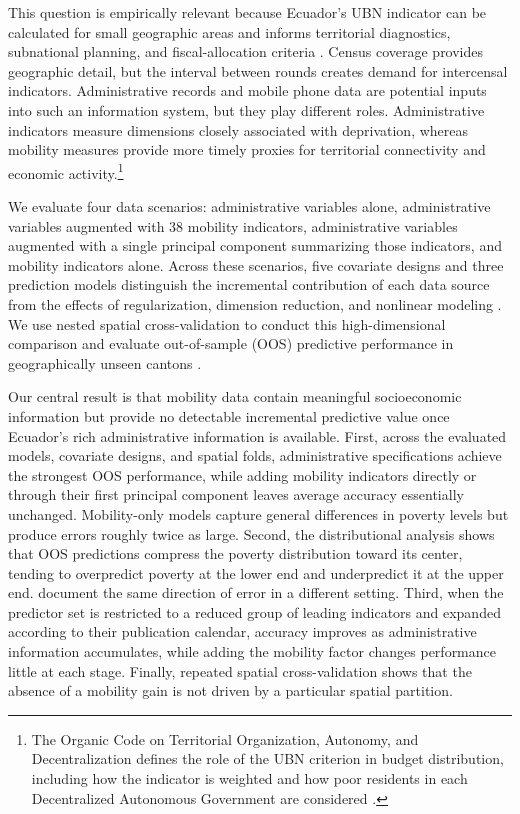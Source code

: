 \documentclass[pdflatex,sn-apa]{sn-jnl}
\begin{document}
This question is empirically relevant because Ecuador's UBN indicator can be calculated for small geographic areas and informs territorial diagnostics, subnational planning, and fiscal-allocation criteria \citep{INEC2024NBI, COOTAD2010}. Census coverage provides geographic detail, but the interval between rounds creates demand for intercensal indicators. Administrative records and mobile phone data are potential inputs into such an information system, but they play different roles. Administrative indicators measure dimensions closely associated with deprivation, whereas mobility measures provide more timely proxies for territorial connectivity and economic activity.\footnote{The Organic Code on Territorial Organization, Autonomy, and Decentralization defines the role of the UBN criterion in budget distribution, including how the indicator is weighted and how poor residents in each Decentralized Autonomous Government are considered \citep{COOTAD2010}.}

We evaluate four data scenarios: administrative variables alone, administrative variables augmented with 38 mobility indicators, administrative variables augmented with a single principal component summarizing those indicators, and mobility indicators alone. Across these scenarios, five covariate designs and three prediction models distinguish the incremental contribution of each data source from the effects of regularization, dimension reduction, and nonlinear modeling \citep{Tibshirani1996, Hastie2009, chen2016xgboost}. We use nested spatial cross-validation to conduct this high-dimensional comparison and evaluate out-of-sample (OOS) predictive performance in geographically unseen cantons \citep{Mahoney2023}.

Our central result is that mobility data contain meaningful socioeconomic information but provide no detectable incremental predictive value once Ecuador's rich administrative information is available. First, across the evaluated models, covariate designs, and spatial folds, administrative specifications achieve the strongest OOS performance, while adding mobility indicators directly or through their first principal component leaves average accuracy essentially unchanged. Mobility-only models capture general differences in poverty levels but produce errors roughly twice as large. Second, the distributional analysis shows that OOS predictions compress the poverty distribution toward its center, tending to overpredict poverty at the lower end and underpredict it at the upper end. \citet{Corral2025} document the same direction of error in a different setting. Third, when the predictor set is restricted to a reduced group of leading indicators and expanded according to their publication calendar, accuracy improves as administrative information accumulates, while adding the mobility factor changes performance little at each stage. Finally, repeated spatial cross-validation shows that the absence of a mobility gain is not driven by a particular spatial partition.
\end{document}
